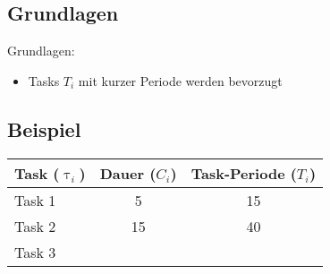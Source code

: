 \subsection{Grundlagen}
\begin{frame}{\subsecname}
		Grundlagen:
		\begin{itemize}
			\item Tasks $T_i$ mit kurzer Periode werden bevorzugt
		\end{itemize}
\end{frame}

\subsection{Beispiel}
\begin{frame}
	\begin{center}
		\begin{tabular}{l||c|c}
				Task ($\uptau_i$) & Dauer ($C_i$) & Task-Periode ($T_i$)\\\hline\hline
				Task 1 & 5 & 15\\
				Task 2 & 15 & 40\\
				Task 3 & 
		\end{tabular}
	\end{center}
\end{frame}

\begin{frame}{\subsecname}
		
\end{frame}

\begin{frame}{\subsecname}
		
\end{frame}

\begin{frame}{\subsecname}
		
\end{frame}